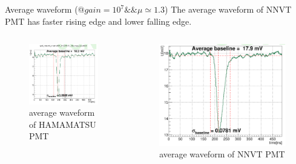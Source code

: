 \documentclass[11pt,compress,xcolor=x11names,UTF8]{beamer}
\begin{document}
\begin{frame}{Average waveform (@$gain=10^7\&\&\mu\simeq 1.3$)}
The average waveform of NNVT PMT has faster rising edge and lower falling edge.
\vspace{-.3cm}
\begin{columns}
\begin{column}{.5\textwidth}
\begin{figure}
\centering
\includegraphics[width=\textwidth]{figures/avewave.png} %
\caption{average waveform of HAMAMATSU PMT}
\end{figure}
\end{column}
\begin{column}{.5\textwidth}
\begin{figure}
\centering
\includegraphics[width=\textwidth]{figures/mcpavewave.png} %
\caption{average waveform of NNVT PMT}
\end{figure}
\end{column}
\end{columns}
\end{frame}
\end{document}
